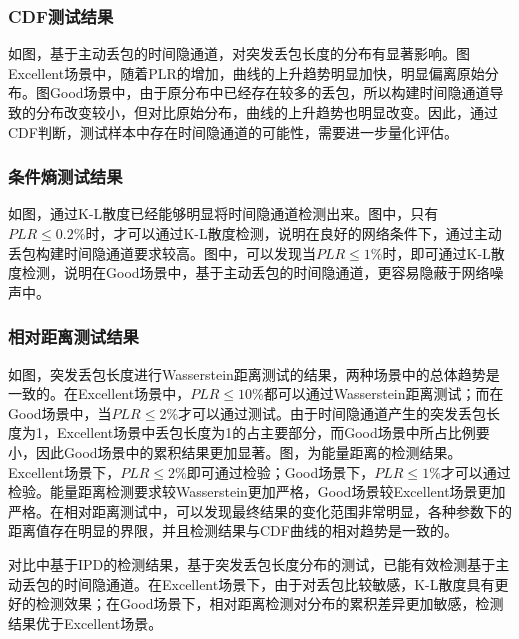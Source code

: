 \subsubsection{CDF测试结果}
\label{chap:analyze:result:burst:cdf}

如图，基于主动丢包的时间隐通道，对突发丢包长度的分布有显著影响。图Excellent场景中，随着PLR的增加，曲线的上升趋势明显加快，明显偏离原始分布。图Good场景中，由于原分布中已经存在较多的丢包，所以构建时间隐通道导致的分布改变较小，但对比原始分布，曲线的上升趋势也明显改变。因此，通过CDF判断，测试样本中存在时间隐通道的可能性，需要进一步量化评估。

\subsubsection{条件熵测试结果}
\label{chap:analyze:result:burst:kld}

如图，通过K-L散度已经能够明显将时间隐通道检测出来。图中，只有$PLR\le 0.2\%$时，才可以通过K-L散度检测，说明在良好的网络条件下，通过主动丢包构建时间隐通道要求较高。图中，可以发现当$PLR\le 1\%$时，即可通过K-L散度检测，说明在Good场景中，基于主动丢包的时间隐通道，更容易隐蔽于网络噪声中。

\subsubsection{相对距离测试结果}
\label{chap:analyze:result:burst:distance}

如图，突发丢包长度进行Wasserstein距离测试的结果，两种场景中的总体趋势是一致的。在Excellent场景中，$PLR\le 10\%$都可以通过Wasserstein距离测试；而在Good场景中，当$PLR\le 2\%$才可以通过测试。由于时间隐通道产生的突发丢包长度为1，Excellent场景中丢包长度为1的占主要部分，而Good场景中所占比例要小，因此Good场景中的累积结果更加显著。图，为能量距离的检测结果。Excellent场景下，$PLR\le 2\%$即可通过检验；Good场景下，$PLR\le 1\%$才可以通过检验。能量距离检测要求较Wasserstein更加严格，Good场景较Excellent场景更加严格。在相对距离测试中，可以发现最终结果的变化范围非常明显，各种参数下的距离值存在明显的界限，并且检测结果与CDF曲线的相对趋势是一致的。

对比中基于IPD的检测结果，基于突发丢包长度分布的测试，已能有效检测基于主动丢包的时间隐通道。在Excellent场景下，由于对丢包比较敏感，K-L散度具有更好的检测效果；在Good场景下，相对距离检测对分布的累积差异更加敏感，检测结果优于Excellent场景。

